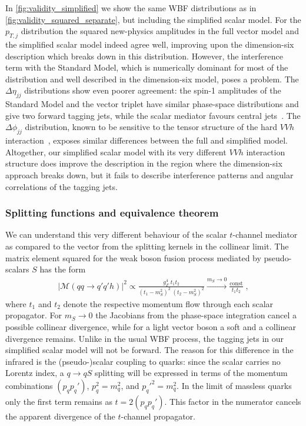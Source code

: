 In \autoref{fig:validity_simplified} we show the same WBF distributions as in
\autoref{fig:validity_squared_separate}, but including the simplified scalar
model. For the $p_{T,j}$ distribution the squared new-physics
amplitudes in the full vector model and the simplified scalar model
indeed agree well, improving upon the dimension-six description which
breaks down in this distribution.  However, the interference term with
the Standard Model, which is numerically dominant for most of the
distribution and well described in the dimension-six model, poses a
problem.  The $\Delta \eta_{jj}$ distributions show even poorer
agreement: the spin-1 amplitudes of the Standard Model and the vector
triplet have similar phase-space distributions and give two forward
tagging jets, while the scalar mediator favours central
jets~\cite{spins2}.  The $\Delta \phi_{jj}$ distribution, known to be
sensitive to the tensor structure of the hard $VVh$
interaction~\cite{delta_phi}, exposes similar differences between the
full and simplified model.  Altogether, our simplified scalar model
with its very different $VVh$ interaction structure does improve the
description in the region where the dimension-six approach breaks down,
but it fails to describe interference patterns and angular
correlations of the tagging jets.



\subsubsection*{Splitting functions and equivalence theorem}

We can understand this very different behaviour of the scalar
$t$-channel mediator as compared to the vector from the splitting
kernels in the collinear limit.  The matrix element squared for the
weak boson fusion process mediated by pseudo-scalars $S$ has the form
%
\begin{align}
 | \mathcal{M}(qq \to q'q'h) |^2 \propto 
  \frac{g_F^4 \;  t_1 t_2}{(t_1 - m_S^2)^2 \; (t_2 - m_S^2)^2} 
\stackrel{m_S \to 0}{\longrightarrow} \frac{\text{const}}{t_1 t_2} \; ,
\end{align}
%
where $t_1$ and $t_2$ denote the respective momentum flow through each
scalar propagator. For $m_S \to 0$ the Jacobians from the phase-space
integration cancel a possible collinear divergence, while for a light
vector boson a soft and a collinear divergence remains. Unlike in the
usual WBF process, the tagging jets in our simplified scalar model
will not be forward.  The reason for this difference in the
infrared is the (pseudo-)scalar coupling to quarks: since the scalar
carries no Lorentz index, a $q \to q S$ splitting will be expressed in
terms of the momentum combinations $(p_q p_q')$, $p_q^2 = m_q^2$, and
$p_q'^2 = m_q^2$. In the limit of massless quarks only the first term
remains as $t = 2 (p_q p_q')$.  This factor in the numerator cancels
the apparent divergence of the $t$-channel propagator.

